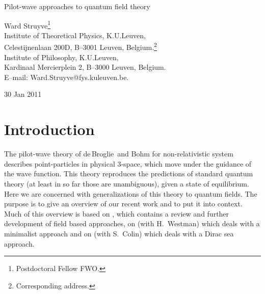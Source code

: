 \documentclass[12pt]{article}
\newcommand{\db}{de$\,$Broglie}
\begin{document}
\vspace*{1.0cm}
\noindent
{\bf
{\large
\begin{center}
Pilot-wave approaches to quantum field theory
\end{center}
}
}



\vspace*{.5cm}
\begin{center}
Ward Struyve{\footnote{Postdoctoral Fellow FWO.}}\\
Institute of Theoretical Physics, K.U.Leuven,\\
Celestijnenlaan 200D, B--3001 Leuven, Belgium.{\footnote{Corresponding address.}}\\
Institute of Philosophy, K.U.Leuven,\\
Kardinaal Mercierplein 2, B--3000 Leuven, Belgium.\\
E--mail: Ward.Struyve@fys.kuleuven.be.
\end{center}

\begin{center}
30 Jan 2011
\end{center}

\begin{abstract}
\noindent
The purpose of this paper is to present an overview of recent work on pilot-wave approaches to quantum field theory. In such approaches, systems are not only described by their wave function, as in standard quantum theory, but also by some additional variables. In the non-relativistic pilot-wave theory of \db\ and Bohm those variables are particle positions. In the context of quantum field theory, there are two natural choices, namely particle positions and fields. The incorporation of those variables makes it possible to provide an objective description of nature in which rather ambiguous notions such as `measurement' and `observer' play no fundamental role. As such, the theory is free of the conceptual difficulties, such as the measurement problem, that plague standard quantum theory.
\end{abstract}


\newpage

\section{Introduction}
The pilot-wave theory of \db\ and Bohm for non-relativistic system describes point-particles in physical 3-space, which move under the guidance of the wave function. This theory reproduces the predictions of standard quantum theory (at least in so far those are unambiguous), given a state of equilibrium. Here we are concerned with generalizations of this theory to quantum fields. The purpose is to give an overview of our recent work and to put it into context. Much of this overview is based on \cite{struyve10}, which contains a review and further development of field based approaches, on \cite{struyve06,struyve07b} (with H.\ Westman) which deals with a minimalist approach and on \cite{colin07} (with S.\ Colin) which deals with a Dirac sea approach.
\end{document}
